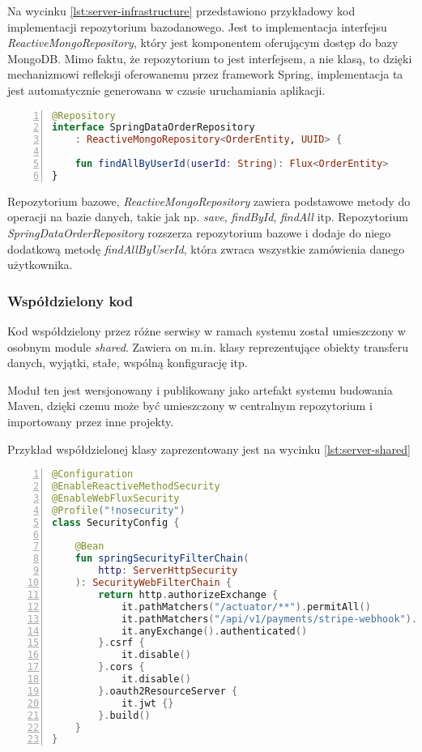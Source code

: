Na wycinku \ref{lst:server-infrastructure} przedstawiono przykładowy kod implementacji repozytorium bazodanowego. Jest to implementacja interfejsu \textit{ReactiveMongoRepository}, który jest komponentem oferującym dostęp do bazy MongoDB. Mimo faktu, że repozytorium to jest interfejsem, a nie klasą, to dzięki mechanizmowi refleksji oferowanemu przez framework Spring, implementacja ta jest automatycznie generowana w czasie uruchamiania aplikacji.

\begin{lstlisting}[caption={Kod implementacji repozytorium bazodanowego},label={lst:server-infrastructure},captionpos=b,language=Kotlin,numbers=left,showstringspaces=false]
@Repository
interface SpringDataOrderRepository 
    : ReactiveMongoRepository<OrderEntity, UUID> {

    fun findAllByUserId(userId: String): Flux<OrderEntity>
}
\end{lstlisting}

Repozytorium bazowe, \textit{ReactiveMongoRepository} zawiera podstawowe metody do operacji na bazie danych, takie jak np. \textit{save}, \textit{findById}, \textit{findAll} itp. Repozytorium \textit{SpringDataOrderRepository} rozszerza repozytorium bazowe i dodaje do niego dodatkową metodę \textit{findAllByUserId}, która zwraca wszystkie zamówienia danego użytkownika.

\subsubsection{Współdzielony kod}

Kod współdzielony przez różne serwisy w ramach systemu został umieszczony w osobnym module \textit{shared}. Zawiera on m.in. klasy reprezentujące obiekty transferu danych, wyjątki, stałe, wspólną konfigurację itp.

Moduł ten jest wersjonowany i publikowany jako artefakt systemu budowania Maven, dzięki czemu może być umieszczony w centralnym repozytorium i importowany przez inne projekty.

Przykład współdzielonej klasy zaprezentowany jest na wycinku \ref{lst:server-shared}

\begin{lstlisting}[caption={Kod klasy konfigurującej mechanizm uwierzytelniania i autoryzacji},label={lst:server-shared},captionpos=b,language=Kotlin,numbers=left,showstringspaces=false]
@Configuration
@EnableReactiveMethodSecurity
@EnableWebFluxSecurity
@Profile("!nosecurity")
class SecurityConfig {

    @Bean
    fun springSecurityFilterChain(
        http: ServerHttpSecurity
    ): SecurityWebFilterChain {
        return http.authorizeExchange {
            it.pathMatchers("/actuator/**").permitAll()
            it.pathMatchers("/api/v1/payments/stripe-webhook").permitAll()
            it.anyExchange().authenticated()
        }.csrf {
            it.disable()
        }.cors {
            it.disable()
        }.oauth2ResourceServer {
            it.jwt {}
        }.build()
    }
}
\end{lstlisting}

